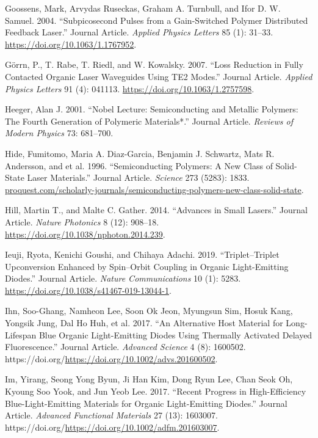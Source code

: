 \documentclass[
  letterpaper,
  DIV=11,
  numbers=noendperiod,
  oneside]{scrreprt}
\newlength{\cslhangindent}
\newlength{\cslentryspacingunit} %
\newenvironment{CSLReferences}[2] %
 {%
  \setlength{\parindent}{0pt}
  \ifodd #1
  \let\oldpar\par
  \def\par{\hangindent=\cslhangindent\oldpar}
  \fi
  \setlength{\parskip}{#2\cslentryspacingunit}
 }%
 {}
\begin{document}
\begin{CSLReferences}{1}{0}
\leavevmode{}%
Goossens, Mark, Arvydas Ruseckas, Graham A. Turnbull, and Ifor D. W.
Samuel. 2004. {``Subpicosecond Pulses from a Gain-Switched Polymer
Distributed Feedback Laser.''} Journal Article. \emph{Applied Physics
Letters} 85 (1): 31--33. \url{https://doi.org/10.1063/1.1767952}.

\leavevmode{}%
Görrn, P., T. Rabe, T. Riedl, and W. Kowalsky. 2007. {``Loss Reduction
in Fully Contacted Organic Laser Waveguides Using TE2 Modes.''} Journal
Article. \emph{Applied Physics Letters} 91 (4): 041113.
\url{https://doi.org/10.1063/1.2757598}.

\leavevmode{}%
Heeger, Alan J. 2001. {``Nobel Lecture: Semiconducting and Metallic
Polymers: The Fourth Generation of Polymeric Materials*.''} Journal
Article. \emph{Reviews of Modern Physics} 73: 681--700.

\leavevmode{}%
Hide, Fumitomo, Maria A. Diaz-Garcia, Benjamin J. Schwartz, Mats R.
Andersson, and et al. 1996. {``Semiconducting Polymers: A New Class of
Solid-State Laser Materials.''} Journal Article. \emph{Science} 273
(5283): 1833.
\href{https://proquest.com/scholarly-journals/semiconducting-polymers-new-class-solid-state}{proquest.com/scholarly-journals/semiconducting-polymers-new-class-solid-state}.

\leavevmode{}%
Hill, Martin T., and Malte C. Gather. 2014. {``Advances in Small
Lasers.''} Journal Article. \emph{Nature Photonics} 8 (12): 908--18.
\url{https://doi.org/10.1038/nphoton.2014.239}.

\leavevmode{}%
Ieuji, Ryota, Kenichi Goushi, and Chihaya Adachi. 2019.
{``Triplet--Triplet Upconversion Enhanced by Spin--Orbit Coupling in
Organic Light-Emitting Diodes.''} Journal Article. \emph{Nature
Communications} 10 (1): 5283.
\url{https://doi.org/10.1038/s41467-019-13044-1}.

\leavevmode{}%
Ihn, Soo-Ghang, Namheon Lee, Soon Ok Jeon, Myungsun Sim, Hosuk Kang,
Yongsik Jung, Dal Ho Huh, et al. 2017. {``An Alternative Host Material
for Long-Lifespan Blue Organic Light-Emitting Diodes Using Thermally
Activated Delayed Fluorescence.''} Journal Article. \emph{Advanced
Science} 4 (8): 1600502.
https://doi.org/\url{https://doi.org/10.1002/advs.201600502}.

\leavevmode{}%
Im, Yirang, Seong Yong Byun, Ji Han Kim, Dong Ryun Lee, Chan Seok Oh,
Kyoung Soo Yook, and Jun Yeob Lee. 2017. {``Recent Progress in
High-Efficiency Blue-Light-Emitting Materials for Organic Light-Emitting
Diodes.''} Journal Article. \emph{Advanced Functional Materials} 27
(13): 1603007.
https://doi.org/\url{https://doi.org/10.1002/adfm.201603007}.


\end{CSLReferences}
\end{document}

